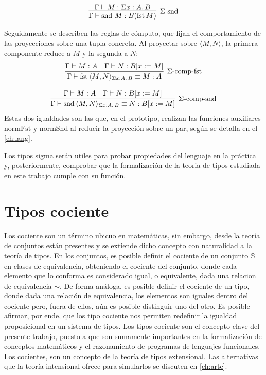 \begin{gather}
  \infer[\text{$\Sigma$-snd}]
  {\Gamma \vdash \mathrm{snd}\ M : B(\mathrm{fst}\, M)}
  {\Gamma \vdash M : \Sigma x : A . \,B}
\end{gather}

\indent Seguidamente se describen las reglas de cómputo, que fijan el comportamiento de las proyecciones sobre una tupla concreta. Al proyectar sobre $\langle M, N \rangle$, la primera componente reduce a $M$ y la segunda a $N$:
\begin{gather}
  \infer[\text{$\Sigma$-comp-fst}]
  {\Gamma \vdash \mathrm{fst}\, \langle M, N \rangle_{\Sigma x : A.\, B} \equiv M : A}
  {\Gamma \vdash M : A & \Gamma \vdash N : B[x := M]}
  \\[2ex]
  \infer[\text{$\Sigma$-comp-snd}]
  {\Gamma \vdash \mathrm{snd}\, \langle M, N \rangle_{\Sigma x : A.\, B} \equiv N : B[x := M]}
  {\Gamma \vdash M : A & \Gamma \vdash N : B[x := M]}
\end{gather}
Estas dos igualdades son las que, en el prototipo, realizan las funciones auxiliares $\mathrm{normFst}$ y $\mathrm{normSnd}$ al reducir la proyección sobre un par, según se detalla en el \cref{ch:lang}.


Los tipos sigma serán utiles para probar propiedades del lenguaje en la práctica y, posteriormente, comprobar que la formalización de la teoria de tipos estudiada en este trabajo cumple con su función.
    
    \section{Tipos cociente}
    Los cociente son un término ubicuo en matemáticas, sin embargo, desde la teoría de conjuntos están presentes y se extiende dicho concepto con naturalidad a la teoría de tipos. En los conjuntos, es posible definir el cociente de un conjunto $\mathbb{S}$ en clases de equivalencia, obteniendo el cociente del conjunto, donde cada elemento que lo conforma es considerado igual, o equivalente, dada una relacion de equivalencia $\sim$. De forma análoga, es posible definir el cociente de un tipo, donde dada una relación de equivalencia, los elementos son iguales dentro del cociente pero, fuera de ellos, aún es posible distinguir uno del otro. Es posible afirmar, por ende, que los tipo cociente nos permiten redefinir la igualdad proposicional en un sistema de tipos.
    \newline
    \newline
    \indent Los tipos cociente son el concepto clave del presente trabajo, puesto a que son sumamente importantes en la formalización de conceptos matemáticos y el razonamiento de programas de lenguajes funcionales. Los cocientes, son un concepto de la teoría de tipos extensional. Las alternativas que la teoría intensional ofrece para simularlos se discuten en \cref{ch:arte}.


